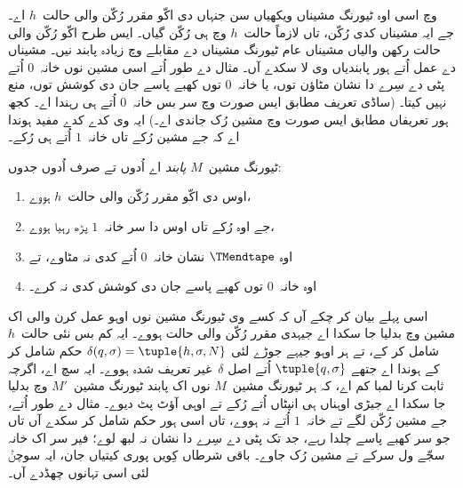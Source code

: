 \documentclass[../../../include/open-logic-section]{subfiles}
\begin{document}

\begin{explain}
 وچ
اسی اوہ ٹیورنگ مشیناں
ویکھیاں سن جنہاں دی
اکّو مقرر رُکّن والی
حالت~$h$ اے۔ جے ایہ
مشیناں کدی رُکّن،
تاں لازماً حالت~$h$
وچ ہی رُکّن گیاں۔
ایس طرح اکّو
رُکّن والی حالت
رکھن والیاں مشیناں
عام ٹیورنگ مشیناں
دے مقابلے وچ زیادہ
پابند نیں۔ مشیناں
دے عمل اُتے ہور
پابندیاں وی لا سکدے
آں۔ مثال دے طور
اُتے اسی مشین نوں
خانہ~$0$ اُتے پٹی
دے سِرے دا نشان
مٹاؤن توں، یا
خانہ~$0$ توں
کھبے پاسے جان دی
کوشش توں، منع
نہیں کیتا۔ (ساڈی
تعریف مطابق ایس
صورت وچ سر بس
خانہ~$0$ اُتے
ہی رہندا اے۔ کجھ ہور تعریفاں مطابق
ایس صورت وچ مشین رُک جاندی اے۔) ایہ وی کدے
کدے مفید ہوندا اے
کہ جے مشین رُکے
تاں خانہ~$1$
اُتے ہی رُکے۔
\end{explain}

\begin{defn}
ٹیورنگ مشین~$M$
\emph{پابند} اے اُدوں
تے صرف اُدوں جدوں:
\begin{enumerate}
    \item اوس دی اکّو
    مقرر رُکّن والی
    حالت~$h$ ہووے،
    \item جے اوہ رُکے
    تاں اوس دا سر خانہ~$1$
    پڑھ رہیا ہووے،
    \item اوہ $\TMendtape$
    نشان خانہ~$0$
    اُتے کدی نہ مٹاوے،
    تے
    \item اوہ خانہ~$0$
    توں کھبے پاسے
    جان دی کوشش کدی
    نہ کرے۔
\end{enumerate}
\end{defn}

\begin{explain}
اسی پہلے بیان کر
چکے آں کہ کسے وی
ٹیورنگ مشین نوں
اوہو عمل کرن والی اک
مشین وچ بدلیا
جا سکدا اے جیہدی
مقرر رُکّن والی حالت
ہووے۔ ایہ کم بس
نئی حالت~$h$
شامل کر کے، تے
ہر اوہو جیہے جوڑے لئی
$\delta(q, \sigma) = \tuple{h, \sigma, N}$
حکم شامل کر کے
ہوندا اے جتھے
$\tuple{q,\sigma}$ اُتے
اصل $\delta$~غیر
تعریف شدہ ہووے۔
ایہ سچ اے، اگرچہ
ثابت کرنا لمبا کم
اے، کہ ہر ٹیورنگ
مشین~$M$ نوں اک
پابند ٹیورنگ
مشین~$M'$ وچ
بدلیا جا سکدا اے
جیڑی اوہناں ہی
انپٹاں اُتے رُکے
تے اوہی آؤٹ پٹ
دیوے۔ مثال دے
طور اُتے، جے مشین
رُکّن لگے تے
خانہ~$1$ اُتے
نہ ہووے، تاں اسی
ہور حکم شامل کر
سکدے آں تاں جو
سر کھبے پاسے
چلدا رہے، جد تک
پٹی دے سِرے دا
نشان نہ لبھ لوے؛
فیر سر اک خانہ سجّے ول سرکے
تے مشین رُک جاوے۔ باقی شرطاں
کِویں پوری کیتیاں
جان، ایہ سوچݨ
لئی اسی تہانوں
چھڈدے آں۔
\end{explain}
\end{document}
